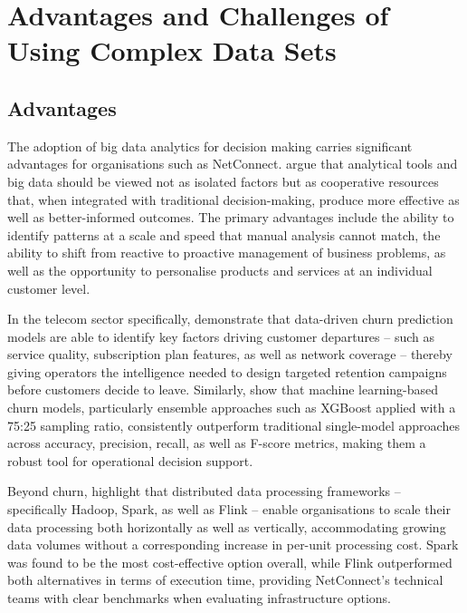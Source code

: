 \documentclass[12pt,a4paper]{article}
\begin{document}
\newpage
\section{Advantages and Challenges of Using Complex Data Sets}

\subsection{Advantages}

The adoption of big data analytics for decision making carries significant advantages for organisations such as NetConnect. \textcite{Bhushan2024} argue that analytical tools and big data should be viewed not as isolated factors but as cooperative resources that, when integrated with traditional decision-making, produce more effective as well as better-informed outcomes. The primary advantages include the ability to identify patterns at a scale and speed that manual analysis cannot match, the ability to shift from reactive to proactive management of business problems, as well as the opportunity to personalise products and services at an individual customer level.

In the telecom sector specifically, \textcite{Saleh2023} demonstrate that data-driven churn prediction models are able to identify key factors driving customer departures -- such as service quality, subscription plan features, as well as network coverage -- thereby giving operators the intelligence needed to design targeted retention campaigns before customers decide to leave. Similarly, \textcite{Sikri2024} show that machine learning-based churn models, particularly ensemble approaches such as XGBoost applied with a 75:25 sampling ratio, consistently outperform traditional single-model approaches across accuracy, precision, recall, as well as F-score metrics, making them a robust tool for operational decision support.

Beyond churn, \textcite{Ullah2022} highlight that distributed data processing frameworks -- specifically Hadoop, Spark, as well as Flink -- enable organisations to scale their data processing both horizontally as well as vertically, accommodating growing data volumes without a corresponding increase in per-unit processing cost. Spark was found to be the most cost-effective option overall, while Flink outperformed both alternatives in terms of execution time, providing NetConnect's technical teams with clear benchmarks when evaluating infrastructure options.
\end{document}
